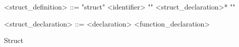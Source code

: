 \begin{Grammar}
 \begin{grammar}
    
    <struct\_definition> ::= "struct" <identifier> "{" <struct\_declaration>* "}"
 
 <struct\_declaration> ::= <declaration>
 \alt <function\_declaration>
    
 \end{grammar}
 \caption{Struct}\label{gra:struct}
\end{Grammar}



